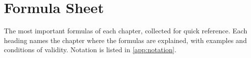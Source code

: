 \chapter{Formula Sheet}\label{app:formulas}

The most important formulas of each chapter, collected for quick reference. Each
heading names the chapter where the formulas are explained, with examples and
conditions of validity. Notation is listed in \cref{app:notation}.

\providecommand{\fsheading}[2]{%
  \par\needspace{4\baselineskip}\medskip
  \noindent{\bfseries\color{MLchapter}#1}\hfill{\footnotesize\cref{#2}}\par
  \nopagebreak\smallskip}

